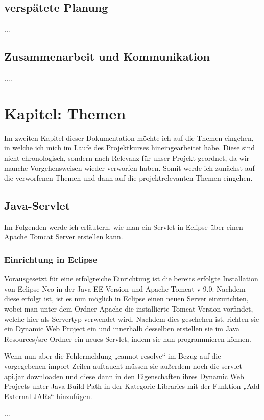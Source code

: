 \documentclass[12pt,a4paper,bibliography=totocnumbered,listof=totocnumbered]{scrartcl}
\begin{document}
\subsection{verspätete Planung}
...
\subsection{Zusammenarbeit und Kommunikation}
....

\section{Kapitel: Themen}
Im zweiten Kapitel dieser Dokumentation möchte ich auf die Themen eingehen, in welche ich mich im Laufe des Projektkurses hineingearbeitet habe.
Diese sind nicht chronologisch, sondern nach Relevanz für unser Projekt geordnet, da wir manche Vorgehensweisen wieder verworfen haben.
Somit werde ich zunächst auf die verworfenen Themen und dann auf die projektrelevanten Themen eingehen.

\subsection{Java-Servlet}
Im Folgenden werde ich erläutern, wie man ein Servlet in Eclipse über einen Apache Tomcat Server erstellen kann.

\subsubsection{Einrichtung in Eclipse}
Vorausgesetzt für eine erfolgreiche Einrichtung ist die bereits erfolgte Installation von Eclipse Neo in der Java EE Version und Apache Tomcat v 9.0. 
Nachdem  diese erfolgt ist, ist es nun möglich in Eclipse einen neuen Server einzurichten, wobei man unter dem Ordner Apache die installierte Tomcat Version vorfindet, welche hier  als Servertyp verwendet wird.
Nachdem dies geschehen ist, richten sie ein Dynamic Web Project ein und innerhalb desselben erstellen sie im Java Resources/src  Ordner ein neues Servlet, indem sie nun programmieren können.

Wenn nun aber die Fehlermeldung  „cannot resolve“ im Bezug auf die vorgegebenen import-Zeilen auftaucht müssen sie außerdem noch die servlet-api.jar downloaden und diese dann in den Eigenschaften ihres Dynamic Web Projects unter Java Build Path in der Kategorie Libraries mit der Funktion „Add External JARs“ hinzufügen. 

...
\end{document}
